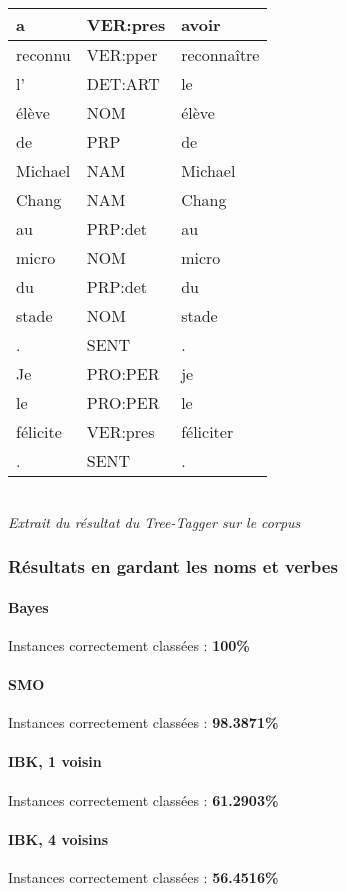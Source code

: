 \documentclass[a4paper,11pt]{article}
\begin{document}
\begin{center}
\begin{tabular}{|C{2.5cm}|C{2.5cm}|C{2.5cm}|}
\hline 
a & VER:pres & avoir \\ \hline
reconnu & VER:pper & reconnaître  \\ \hline
l' & DET:ART & le  \\ \hline
élève & NOM & élève  \\ \hline
de & PRP & de  \\ \hline
Michael & NAM & Michael  \\ \hline
Chang & NAM & Chang  \\ \hline
au & PRP:det & au  \\ \hline
micro & NOM & micro \\ \hline
du & PRP:det & du  \\ \hline
stade & NOM & stade  \\ \hline
. & SENT & .  \\ \hline
Je & PRO:PER & je  \\ \hline
le & PRO:PER & le  \\ \hline
félicite & VER:pres & féliciter  \\ \hline
. & SENT & .  \\ \hline
\end{tabular}\\
\textit{Extrait du résultat du Tree-Tagger sur le corpus}
\end{center}

\subsubsection{Résultats en gardant les noms et verbes}
\paragraph{Bayes} Instances correctement classées : \textbf{100\%}
\paragraph{SMO} Instances correctement classées : \textbf{98.3871\%}
\paragraph{IBK, 1 voisin} Instances correctement classées : \textbf{61.2903\%}
\paragraph{IBK, 4 voisins} Instances correctement classées : \textbf{56.4516\%}
\end{document}
